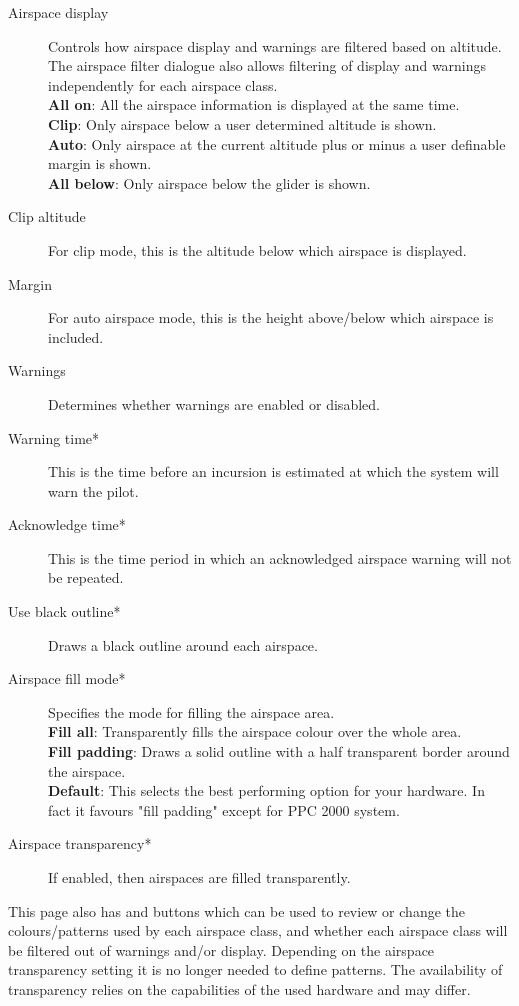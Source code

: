 \begin{description}
\item[Airspace display]  Controls how airspace display and warnings are filtered 
  based on altitude.  The airspace filter dialogue also allows filtering
  of display and warnings independently for each airspace class. \\
  {\bf All on}: All the airspace information is displayed at the same time. \\
  {\bf Clip}: Only airspace below a user determined altitude is shown. \\
  {\bf Auto}: Only airspace at the current altitude plus or minus a user definable margin is shown. \\
  {\bf All below}:  Only airspace below the glider is shown.
\item[Clip altitude] For clip mode, this is the altitude below which airspace is displayed.
\item[Margin]  For auto airspace mode, this is the height above/below which airspace is included.
\item[Warnings]  Determines whether warnings are enabled or disabled.
\item[Warning time*]  This is the time before an incursion is estimated at
  which the system will warn the pilot.
\item[Acknowledge time*]  This is the time period in which an acknowledged airspace 
  warning will not be repeated.
\item[Use black outline*]  Draws a black outline around each airspace.
\item[Airspace fill mode*]  Specifies the mode for filling the airspace area. \\
  {\bf Fill all}:  Transparently fills the airspace colour over the whole area. \\
  {\bf Fill padding}: Draws a solid outline with a half transparent border around the airspace. \\
  {\bf Default}:  This selects the best performing option for your hardware. In fact 
  it favours "fill padding" except for PPC 2000 system.
\item[Airspace transparency*]  If enabled, then airspaces are filled transparently.
\end{description}

This page also has  and  buttons which
can be used to review or change the colours/patterns used by each
airspace class, and whether each airspace class will be filtered out
of warnings and/or display. Depending on the airspace transparency setting it is 
no longer needed to define patterns. The availability of transparency relies 
on the capabilities of the used hardware and may differ. 

